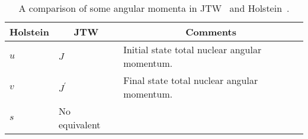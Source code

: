 %
%
%
\renewcommand{\arraystretch}{1.6}
\begin{table}[h!!!!t]
	\begin{center}
	\begin{tabular}{ | l | l | p{3.35in} | }
		\multicolumn{1}{c}{Holstein} 			& \multicolumn{1}{c}{JTW} 		& \multicolumn{1}{c}{Comments}
		\\  \hline
		$u$ 									& $J$							& Initial state total nuclear angular momentum.
		\\  \hline
		$v$ 									& $J^\prime$					& Final state total nuclear angular momentum.
		\\  \hline
		$s$										& No equivalent				& %
		\\  \hline
	\end{tabular}
	\end{center}
	\caption[Angular Momentum Notation]{A comparison of some angular momenta in JTW~\cite{jtw,jtw_coulomb} and Holstein~\cite{holstein,holstein_errata}.}
	\label{table:compare_notation_angularmomentum}
\end{table}
\renewcommand{\arraystretch}{1}
%
%